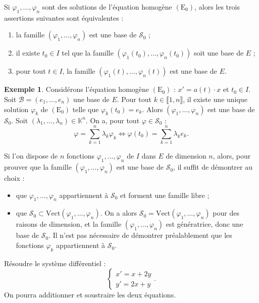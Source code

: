 \documentclass[french]{article}
\newcommand{\K}{\mathbb{K}}
\newcommand{\Vect}{\text{Vect}}
\theoremstyle{plain}
\theoremstyle{definition}
\newtheorem*{ex}{Exemple}
\theoremstyle{remark}
\begin{document}
\begin{prop}%
	Si $\varphi_1,\ldots,\varphi_n$ sont des solutions de l'équation homogène $(\text{E}_0)$, alors les trois assertions suivantes sont équivalentes :
	\begin{enumerate}[label=(\roman*)]
		\item la famille $(\varphi_1,\ldots,\varphi_n)$ est une base de $\mathcal{S}_0$ ;
		\item il existe $t_0\in I$ tel que la famille $(\varphi_1(t_0),\ldots,\varphi_n(t_0))$ soit une base de $E$ ;
		\item pour tout $t\in I$, la famille $(\varphi_1(t),\ldots,\varphi_n(t))$ est une base de $E$.
	\end{enumerate}
\end{prop}

\begin{ex}
	Considérons l'équation homogène $(\text{E}_0)$ : $x'=a(t)\cdot x$ et $t_0\in I$. Soit $\mathcal{B}=(e_1,\ldots,e_n)$ une base de $E$. Pour tout $k\in\llbracket1,n\rrbracket$, il existe une unique solution $\varphi_k$ de $(\text{E}_0)$ telle que $\varphi_k(t_0)=e_k$. Alors $(\varphi_1,\ldots,\varphi_n)$ est une base de $\mathcal{S}_0$. Soit $(\lambda_1,\ldots,\lambda_n)\in\K^n$. On a, pour tout $\varphi\in\mathcal{S}_0$ :
	$$\varphi=\sum_{k=1}^{n}\lambda_k\varphi_k\iff\varphi(t_0)=\sum_{k=1}^{n}\lambda_ke_k.$$
\end{ex}

\begin{met}
	Si l'on dispose de $n$ fonctions $\varphi_1,\ldots,\varphi_n$ de $I$ dans $E$ de dimension $n$, alors, pour prouver que la famille $(\varphi_1,\ldots,\varphi_n)$ est une base de $\mathcal{S}_0$, il suffit de démontrer au choix :
	\begin{itemize}
		\item que $\varphi_1,\ldots,\varphi_n$ appartiennent à $\mathcal{S}_0$ et forment une famille libre ;
		\item que $\mathcal{S}_0\subset\Vect(\varphi_1,\ldots,\varphi_n)$. On a alors $\mathcal{S}_0=\Vect(\varphi_1,\ldots,\varphi_n)$ pour des raisons de dimension, et la famille $(\varphi_1,\ldots,\varphi_n)$ est génératrice, donc une base de $\mathcal{S}_0$. Il n'est pas nécessaire de démontrer préalablement que les fonctions $\varphi_k$ appartiennent à $\mathcal{S}_0$.
	\end{itemize}
\end{met}

\begin{exo}
	Résoudre le système différentiel :
	$$\begin{cases}
		x'=x+2y\\
		y'=2x+y
	\end{cases}.$$ On pourra additionner et soustraire les deux équations.
\end{exo}
\end{document}
